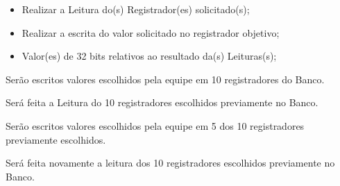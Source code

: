 \documentclass{article}
\begin{document}
  \actions
  \begin{itemize}
     \item Realizar a Leitura do(s) Registrador(es) solicitado(s);
     \item Realizar a escrita do valor solicitado no registrador objetivo;
    \end{itemize}
  
  \results
  	\begin{itemize}
     \item Valor(es) de 32 bits relativos ao resultado da(s) Leituras(s); 
    \end{itemize}
  
  \begin{mainflow}
     \item Serão escritos valores escolhidos pela equipe em 10 registradores do Banco.
     \item Será feita a Leitura do 10 registradores escolhidos previamente no Banco.
     \item Serão escritos valores escolhidos pela equipe em 5 dos 10 registradores previamente escolhidos.
     \item Será feita novamente a leitura dos 10 registradores escolhidos previamente no Banco.
  \end{mainflow}

% 
% 
\end{document}
